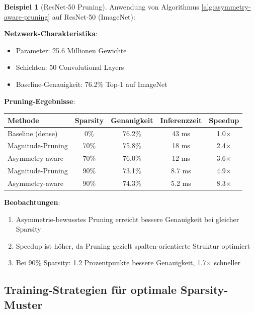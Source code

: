 \documentclass[a4paper,12pt]{report}
\theoremstyle{definition}
\newtheorem{beispiel}{Beispiel}
\begin{document}
	\begin{beispiel}[ResNet-50 Pruning]
		Anwendung von Algorithmus \ref{alg:asymmetry-aware-pruning} auf ResNet-50 (ImageNet):
		
		\textbf{Netzwerk-Charakteristika}:
		\begin{itemize}
			\item Parameter: 25.6 Millionen Gewichte
			\item Schichten: 50 Convolutional Layers
			\item Baseline-Genauigkeit: 76.2\% Top-1 auf ImageNet
		\end{itemize}
		
		\textbf{Pruning-Ergebnisse}:
		\begin{center}
			\begin{tabular}{|l|c|c|c|c|}
				\hline
				\textbf{Methode} & \textbf{Sparsity} & \textbf{Genauigkeit} & \textbf{Inferenzzeit} & \textbf{Speedup} \\
				\hline
				Baseline (dense) & 0\% & 76.2\% & 43 ms & 1.0$\times$ \\
				Magnitude-Pruning & 70\% & 75.8\% & 18 ms & 2.4$\times$ \\
				Asymmetry-aware & 70\% & 76.0\% & 12 ms & 3.6$\times$ \\
				Magnitude-Pruning & 90\% & 73.1\% & 8.7 ms & 4.9$\times$ \\
				Asymmetry-aware & 90\% & 74.3\% & 5.2 ms & 8.3$\times$ \\
				\hline
			\end{tabular}
		\end{center}
		
		\textbf{Beobachtungen}:
		\begin{enumerate}
			\item Asymmetrie-bewusstes Pruning erreicht bessere Genauigkeit bei gleicher Sparsity
			\item Speedup ist höher, da Pruning gezielt spalten-orientierte Struktur optimiert
			\item Bei 90\% Sparsity: 1.2 Prozentpunkte bessere Genauigkeit, 1.7$\times$ schneller
		\end{enumerate}
	\end{beispiel}
	
	\subsection{Training-Strategien für optimale Sparsity-Muster}
	
\end{document}
